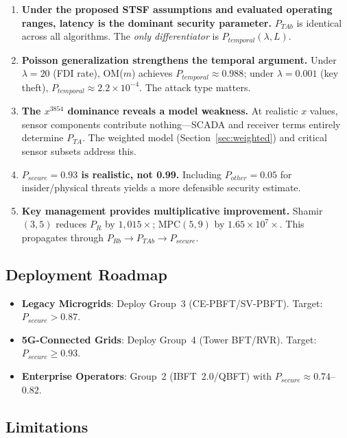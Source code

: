 \documentclass[10pt,twocolumn,letterpaper]{article}
\begin{document}
\begin{enumerate}[leftmargin=*]
    \item \textbf{Under the proposed STSF assumptions and evaluated operating ranges, latency is the dominant security parameter.} $P_{TAb}$ is identical across all algorithms. The \emph{only differentiator} is $P_{temporal}(\lambda, L)$.

    \item \textbf{Poisson generalization strengthens the temporal argument.} Under $\lambda = 20$ (FDI rate), OM($m$) achieves $P_{temporal} \approx 0.988$; under $\lambda = 0.001$ (key theft), $P_{temporal} \approx 2.2 \times 10^{-4}$. The attack type matters.

    \item \textbf{The $x^{3854}$ dominance reveals a model weakness.} At realistic $x$ values, sensor components contribute nothing---SCADA and receiver terms entirely determine $P_{TA}$. The weighted model (Section~\ref{sec:weighted}) and critical sensor subsets address this.

    \item \textbf{$P_{secure} = 0.93$ is realistic, not 0.99.} Including $P_{other} = 0.05$ for insider/physical threats yields a more defensible security estimate.

    \item \textbf{Key management provides multiplicative improvement.} Shamir$(3,5)$ reduces $P_R$ by $1{,}015\times$; MPC$(5,9)$ by $1.65 \times 10^{7}\times$. This propagates through $P_{Rb} \rightarrow P_{TAb} \rightarrow P_{secure}$.
\end{enumerate}

\subsection{Deployment Roadmap}

\begin{itemize}[leftmargin=*]
    \item \textbf{Legacy Microgrids}: Deploy Group~3 (CE-PBFT/SV-PBFT). Target: $P_{secure} > 0.87$.
    \item \textbf{5G-Connected Grids}: Deploy Group~4 (Tower BFT/RVR). Target: $P_{secure} \geq 0.93$.
    \item \textbf{Enterprise Operators}: Group~2 (IBFT~2.0/QBFT) with $P_{secure} \approx 0.74$--$0.82$.
\end{itemize}

\subsection{Limitations}
\end{document}
